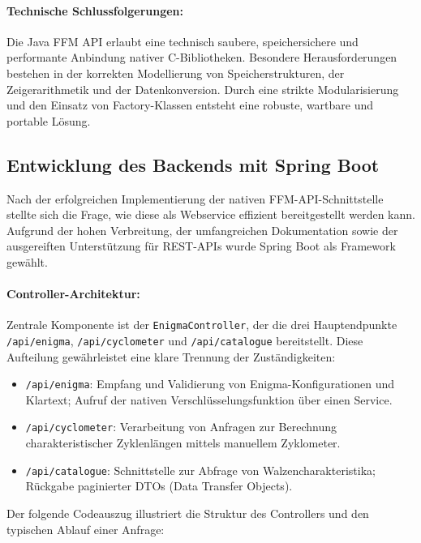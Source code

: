 \documentclass[12pt, ngerman, a4paper, numbers=noenddot]{article}
\begin{document}
\paragraph{Technische Schlussfolgerungen:}

Die Java FFM API erlaubt eine technisch saubere, speichersichere und performante Anbindung nativer C-Bibliotheken. Besondere Herausforderungen bestehen in der korrekten Modellierung von Speicherstrukturen, der Zeigerarithmetik und der Datenkonversion. Durch eine strikte Modularisierung und den Einsatz von Factory-Klassen entsteht eine robuste, wartbare und portable Lösung.




\subsection{Entwicklung des Backends mit Spring Boot}

Nach der erfolgreichen Implementierung der nativen FFM-API-Schnittstelle stellte sich die Frage, wie diese als Webservice effizient bereitgestellt werden kann. Aufgrund der hohen Verbreitung, der umfangreichen Dokumentation sowie der ausgereiften Unterstützung für REST-APIs wurde Spring Boot als Framework gewählt.

\paragraph{Controller-Architektur:}

Zentrale Komponente ist der \lstinline|EnigmaController|, der die drei Hauptendpunkte \lstinline|/api/enigma|, \lstinline|/api/cyclometer| und \lstinline|/api/catalogue| bereitstellt. Diese Aufteilung gewährleistet eine klare Trennung der Zuständigkeiten:

\begin{itemize}
	\item \lstinline|/api/enigma|: Empfang und Validierung von Enigma\hyp{}Konfigurationen und Klartext; Aufruf der nativen Verschlüsselungsfunktion über einen Service.
	\item \lstinline|/api/cyclometer|: Verarbeitung von Anfragen zur Berechnung charakteristischer Zyklenlängen mittels manuellem Zyklometer.
	\item \lstinline|/api/catalogue|: Schnittstelle zur Abfrage von Walzencharakteristika; Rückgabe paginierter DTOs (Data Transfer Objects).
\end{itemize}

Der folgende Codeauszug illustriert die Struktur des Controllers und den typischen Ablauf einer Anfrage:
\end{document}
